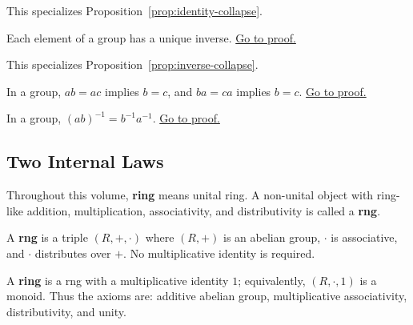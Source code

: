 \begin{remark*}[Dependency]
This specializes Proposition~\ref{prop:identity-collapse}.
\end{remark*}

\begin{proposition}
\label{prop:group-inverse-unique}
Each element of a group has a unique inverse.
\hyperref[prf:group-inverse-unique]{Go to proof.}
\end{proposition}

\begin{remark*}[Dependency]
This specializes Proposition~\ref{prop:inverse-collapse}.
\end{remark*}

\begin{proposition}
\label{prop:group-cancellation}
In a group, $ab=ac$ implies $b=c$, and $ba=ca$ implies $b=c$.
\hyperref[prf:group-cancellation]{Go to proof.}
\end{proposition}

\begin{proposition}
\label{prop:socks-shoes}
In a group, $(ab)^{-1}=b^{-1}a^{-1}$.
\hyperref[prf:socks-shoes]{Go to proof.}
\end{proposition}

\subsection{Two Internal Laws}
\label{sec:two-internal-laws}

\begin{remark*}[Convention]
Throughout this volume, \textbf{ring} means unital ring. A non-unital object
with ring-like addition, multiplication, associativity, and distributivity is
called a \textbf{rng}.
\end{remark*}

\begin{definition}[Rng]
\label{def:rng}
A \textbf{rng} is a triple $(R,+,\cdot)$ where $(R,+)$ is an abelian group,
$\cdot$ is associative, and $\cdot$ distributes over $+$. No
multiplicative identity is required.
\end{definition}

\begin{definition}[Ring]
\label{def:ring}
A \textbf{ring} is a rng with a multiplicative identity $1$; equivalently,
$(R,\cdot,1)$ is a monoid. Thus the axioms are: additive abelian group,
multiplicative associativity, distributivity, and unity.
\end{definition}

